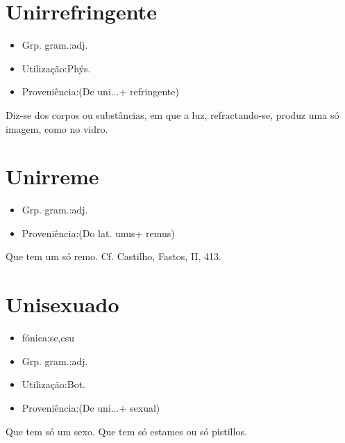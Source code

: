 \documentclass{article}
\begin{document}
\section{Unirrefringente}
\begin{itemize}
\item {Grp. gram.:adj.}
\end{itemize}
\begin{itemize}
\item {Utilização:Phýs.}
\end{itemize}
\begin{itemize}
\item {Proveniência:(De \textunderscore uni...\textunderscore  + \textunderscore refringente\textunderscore )}
\end{itemize}
Diz-se dos corpos ou substâncias, em que a luz, refractando-se, produz uma só imagem, como no vidro.
\section{Unirreme}
\begin{itemize}
\item {Grp. gram.:adj.}
\end{itemize}
\begin{itemize}
\item {Proveniência:(Do lat. \textunderscore unus\textunderscore  + \textunderscore remus\textunderscore )}
\end{itemize}
Que tem um só remo. Cf. Castilho, \textunderscore Fastos\textunderscore , II, 413.
\section{Unisexuado}
\begin{itemize}
\item {fónica:se,csu}
\end{itemize}
\begin{itemize}
\item {Grp. gram.:adj.}
\end{itemize}
\begin{itemize}
\item {Utilização:Bot.}
\end{itemize}
\begin{itemize}
\item {Proveniência:(De \textunderscore uni...\textunderscore  + \textunderscore sexual\textunderscore )}
\end{itemize}
Que tem só um sexo.
Que tem só estames ou só pistillos.
\end{document}
